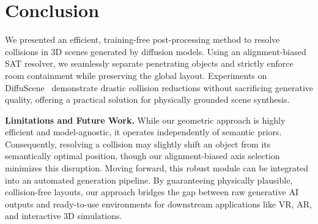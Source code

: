 \section{Conclusion}
We presented an efficient, training-free post-processing method to resolve collisions in 3D scenes generated by diffusion models. Using an alignment-biased SAT resolver, we seamlessly separate penetrating objects and strictly enforce room containment while preserving the global layout. Experiments on DiffuScene~\cite{tang2024diffuscenedenoisingdiffusionmodels} demonstrate drastic collision reductions without sacrificing generative quality, offering a practical solution for physically grounded scene synthesis.

\textbf{Limitations and Future Work.} While our geometric approach is highly efficient and model-agnostic, it operates independently of semantic priors. Consequently, resolving a collision may slightly shift an object from its semantically optimal position, though our alignment-biased axis selection minimizes this disruption. Moving forward, this robust module can be integrated into an automated generation pipeline. By guaranteeing physically plausible, collision-free layouts, our approach bridges the gap between raw generative AI outputs and ready-to-use environments for downstream applications like VR, AR, and interactive 3D simulations.